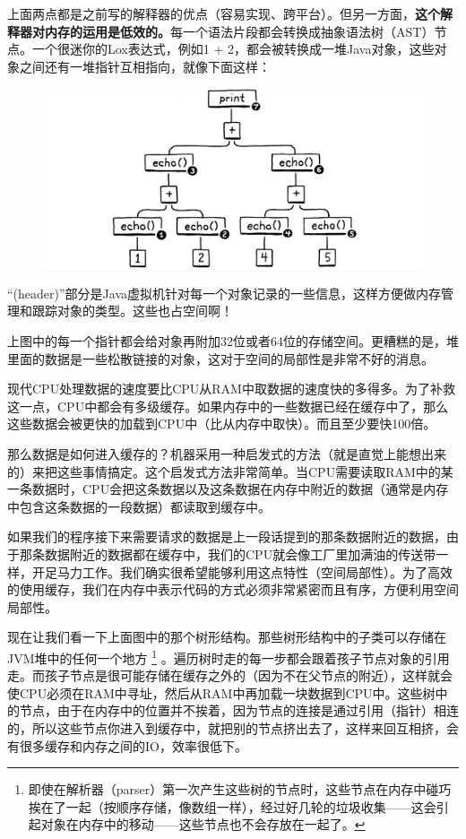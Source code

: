 \documentclass[cn,10pt,math=newtx,citestyle=gb7714-2015,bibstyle=gb7714-2015]{elegantbook}
\begin{document}
上面两点都是之前写的解释器的优点（容易实现、跨平台）。但另一方面，\textbf{这个解释器对内存的运用是低效的。}每一个语法片段都会转换成抽象语法树（AST）节点。一个很迷你的Lox表达式，例如1 + 2，都会被转换成一堆Java对象，这些对象之间还有一堆指针互相指向，就像下面这样：

\begin{figure}[h]
\centering
\includegraphics[width=\textwidth]{image/a-virtual-machine/ast.png}
\end{figure}

\begin{tcolorbox}
“(header)”部分是Java虚拟机针对每一个对象记录的一些信息，这样方便做内存管理和跟踪对象的类型。这些也占空间啊！
\end{tcolorbox}

上图中的每一个指针都会给对象再附加32位或者64位的存储空间。更糟糕的是，堆里面的数据是一些松散链接的对象，这对于空间的局部性是非常不好的消息。

现代CPU处理数据的速度要比CPU从RAM中取数据的速度快的多得多。为了补救这一点，CPU中都会有多级缓存。如果内存中的一些数据已经在缓存中了，那么这些数据会被更快的加载到CPU中（比从内存中取快）。而且至少要快100倍。

那么数据是如何进入缓存的？机器采用一种启发式的方法（就是直觉上能想出来的）来把这些事情搞定。这个启发式方法非常简单。当CPU需要读取RAM中的某一条数据时，CPU会把这条数据以及这条数据在内存中附近的数据（通常是内存中包含这条数据的一段数据）都读取到缓存中。

如果我们的程序接下来需要请求的数据是上一段话提到的那条数据附近的数据，由于那条数据附近的数据都在缓存中，我们的CPU就会像工厂里加满油的传送带一样，开足马力工作。我们确实很希望能够利用这点特性（空间局部性）。为了高效的使用缓存，我们在内存中表示代码的方式必须非常紧密而且有序，方便利用空间局部性。

现在让我们看一下上面图中的那个树形结构。那些树形结构中的子类可以存储在JVM堆中的任何一个地方 \footnote{即使在解析器（parser）第一次产生这些树的节点时，这些节点在内存中碰巧挨在了一起（按顺序存储，像数组一样），经过好几轮的垃圾收集——这会引起对象在内存中的移动——这些节点也不会存放在一起了。} 。遍历树时走的每一步都会跟着孩子节点对象的引用走。而孩子节点是很可能存储在缓存之外的（因为不在父节点的附近），这样就会使CPU必须在RAM中寻址，然后从RAM中再加载一块数据到CPU中。这些树中的节点，由于在内存中的位置并不挨着，因为节点的连接是通过引用（指针）相连的，所以这些节点你进入到缓存中，就把别的节点挤出去了，这样来回互相挤，会有很多缓存和内存之间的IO，效率很低下。
\end{document}
